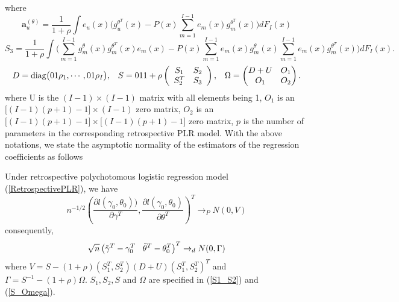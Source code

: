 \documentclass[11pt]{article}
\theoremstyle{plain}
\theoremstyle{definition}
\theoremstyle{remark}
\theoremstyle{definition}
\begin{document}
where
$$
\bm{a}_u^{(\theta)}=\frac{1}{1+\rho} \int
e_{u}(x)\Big(g_u^{\theta^T}(x)-P(x)\sum_{m=1}^{I-1}e_{m}(x)g_m^{\theta^T}(x)\Big)dF_I(x)
$$
\begin{equation}
S_3=\frac{1}{1+\rho}\int\Big(\sum_{m=1}^{I-1}g_m^{\theta}(x)g_m^{\theta^T}(x)e_m(x)
-P(x)\sum_{m=1}^{I-1}e_m(x)g_m^{\theta}(x)\sum_{m=1}^{I-1}e_m(x)g_m^{\theta^T}(x)\Big)dF_I(x).\label{S3}
\end{equation}
\begin{equation}
\begin{array}{ccc} D=\mbox{diag} \big(\frac{1}{\rho_1}, \cdots, \frac{1}{\rho_{I}}  \big),
&S=\frac{1}{1+\rho}\left(\begin{array}{cc} S_1 & S_2 \\
S_{2}^T & S_3 \end{array} \right), & \Omega=\begin{pmatrix}
D+U&O_1\cr O_1&O_2\end{pmatrix}.
\end{array}\label{S_Omega}
\end{equation}
where U is the $(I-1)\times(I-1)$ matrix with all elements being 1, $O_1$ is an $\big[(I-1)(p+1)-1\big]\times (I-1)$ zero matrix, $O_2$ is an $\big[(I-1)(p+1)-1\big]\times \big[(I-1)(p+1)-1\big]$ zero matrix, $p$ is the number of parameters in the corresponding retrospective PLR model. With the above notations, we state the asymptotic normality of the estimators of the regression coefficients as follows

 {\theorem \citep{ZhangBiao-JMA-2002, ZhangBiao-AustrNZJS-2004, Peng-Zhang-JSPI-2008} Under retrospective polychotomous logistic regression model (\ref{RetrospectivePLR}), we have
$$n^{-1/2}\left( \frac{\partial l(\gamma_0, \theta_0))}{\partial \gamma^T},\frac{\partial l(\gamma_0, \theta_0)}{\partial \theta^T} \right)^T \rightarrow_P N(0,V) $$
consequently,
$$\sqrt{n}\left( \tilde{\gamma}^T-\gamma_0^T \hspace{3mm} \tilde{\theta}^T-\theta_0^T \right)^T \rightarrow_d N(0,\Gamma)$$
\noindent where $V=S-(1+\rho)(S_1^T, S_2^T)(D+U)(S_1^T, S_2^T)^T$ and $\Gamma=S^{-1}-(1+\rho)\Omega$. $S_1, S_2, S$ and $\Omega$ are specified in (\ref{S1_S2}) and (\ref{S_Omega}).}
\end{document}
